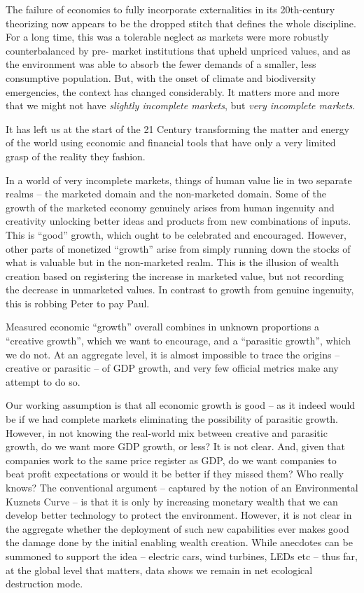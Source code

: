 \documentclass[
]{book}
\begin{document}
The failure of economics to fully incorporate externalities in its 20th-century
theorizing now appears to be the dropped stitch that defines the whole discipline. For a long
time, this was a tolerable neglect as markets were more robustly counterbalanced by pre-
market institutions that upheld unpriced values, and as the environment was able to absorb
the fewer demands of a smaller, less consumptive population. But, with the onset of climate
and biodiversity emergencies, the context has changed considerably. It matters more and
more that we might not have \emph{slightly incomplete markets}, but \emph{very incomplete markets}.

It has left us at the start of the 21 Century transforming
the matter and energy of the world using
economic and financial tools that have only
a very limited grasp of the reality they fashion.

In a world of very incomplete markets, things of human value lie in two separate realms -- the
marketed domain and the non-marketed domain. Some of the growth of the marketed
economy genuinely arises from human ingenuity and creativity unlocking better ideas and
products from new combinations of inputs. This is ``good'' growth, which ought to be
celebrated and encouraged. However, other parts of monetized ``growth'' arise from simply
running down the stocks of what is valuable but in the non-marketed realm. This is the illusion
of wealth creation based on registering the increase in marketed value, but not recording the
decrease in unmarketed values. In contrast to growth from genuine ingenuity, this is robbing
Peter to pay Paul.

Measured economic ``growth'' overall combines in unknown proportions a ``creative
growth'', which we want to encourage, and a ``parasitic growth'', which we do not. At an
aggregate level, it is almost impossible to trace the origins -- creative or parasitic -- of GDP
growth, and very few official metrics make any attempt to do so.

Our working assumption is that all
economic growth is good -- as it indeed would be if we had complete markets eliminating the
possibility of parasitic growth. However, in not knowing the real-world mix between creative
and parasitic growth, do we want more GDP growth, or less? It is not clear. And, given that
companies work to the same price register as GDP, do we want companies to beat profit
expectations or would it be better if they missed them? Who really knows?
The conventional argument -- captured by the notion of an Environmental Kuznets Curve -- is
that it is only by increasing monetary wealth that we can develop better technology to protect
the environment. However, it is not clear in the aggregate whether the deployment of such
new capabilities ever makes good the damage done by the initial enabling wealth creation.
While anecdotes can be summoned to support the idea -- electric cars, wind turbines, LEDs
etc -- thus far, at the global level that matters, data shows we remain in net ecological
destruction mode.
\end{document}
